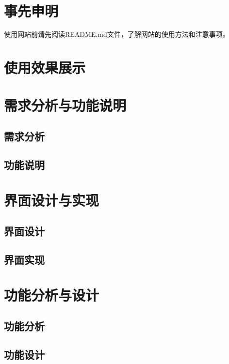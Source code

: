 \documentclass[12pt]{ctexart}
\begin{document}
\tableofcontents

\section{事先申明}
使用网站前请先阅读README.md文件，了解网站的使用方法和注意事项。

\section{使用效果展示}

\section{需求分析与功能说明}
\subsection{需求分析}
\subsection{功能说明}

\section{界面设计与实现}
\subsection{界面设计}
\subsection{界面实现}

\section{功能分析与设计}
\subsection{功能分析}
\subsection{功能设计}
\end{document}
